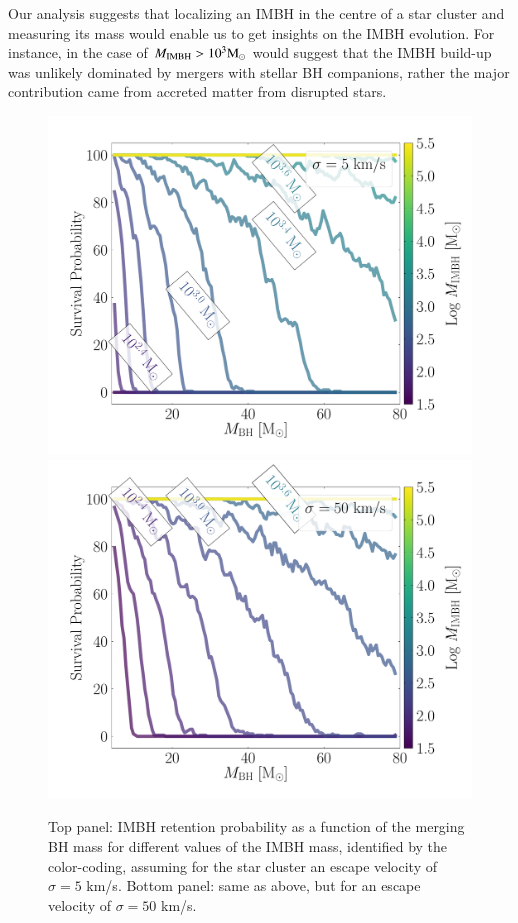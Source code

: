 \documentclass[article]{aa}
\newcommand{\Ms}{{\rm M}_\odot}
\newcommand{\ibh}{{\rm IMBH}}
\begin{document}
{Our analysis suggests that localizing an IMBH in the centre of a star cluster and measuring its mass would enable us to get insights on the IMBH evolution. For instance, in the case of $M_\ibh > 10^3\Ms$ would suggest that the IMBH build-up was unlikely dominated by mergers with stellar BH companions, rather the major contribution came from accreted matter from disrupted stars.
}

\begin{figure}
\centering
\includegraphics[width=\columnwidth]{survival}
\includegraphics[width=\columnwidth]{survival50}
\caption{Top panel: IMBH retention probability as a function of the merging BH mass for different values of the IMBH mass, identified by the color-coding, assuming for the star cluster an escape velocity of $\sigma = 5$ km/s. Bottom panel: same as above, but for an escape velocity of $\sigma = 50$ km/s.}
\label{fig:survival}
\end{figure}
\end{document}
